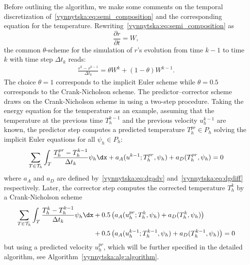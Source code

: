 Before outlining the algorithm, we make some comments on the temporal
discretization of~\eqref{vynnytska:eq:semi_composition} and the
corresponding equation for the
temperature. Rewriting~\eqref{vynnytska:eq:semi_composition} as
\begin{equation}
  \frac{\partial r}{\partial t} = W,
\end{equation}
the common $\theta$-scheme for the simulation of $r$'s evolution from
time $k-1$ to time $k$ with time step $\Delta t_k$ reads:
\begin{align}
  \label{vynnytska:eq:thetascheme}
  \frac{r^k - r^{k-1}}{\Delta t_k} = \theta W^k + (1 - \theta) W^{k-1}.
\end{align}
The choice $\theta = 1$ corresponds to the implicit Euler scheme while
$\theta = 0.5$ corresponds to the Crank-Nicholson scheme. The
predictor--corrector scheme draws on the Crank-Nicholson scheme in
using a two-step procedure. Taking the energy equation for the
temperature as an example, assuming that the temperature at the
previous time $T_h^{k-1}$ and the previous velocity $u_h^{k-1}$ are
known, the predictor step computes a predicted temperature $T_h^{pr}
\in P_h$ solving the implicit Euler equations for all $\psi_h \in
P_h$:
\begin{equation}
  \label{vynnytska:eq:predictor}
  \sum_{T \in \mathcal{T}_h}
  \int_T \frac{T_h^{pr} - T_h^{k-1}}{\Delta t_k} \psi_h \dx
  + a_{A} (u^{k-1}; T_h^{pr}, \psi_h) + a_D (T_h^{pr}, \psi_h) = 0
\end{equation}
where $a_A$ and $a_D$ are defined by~\eqref{vynnytska:eq:dgadv}
and~\eqref{vynnytska:eq:dgdiff} respectively. Later, the corrector
step computes the corrected temperature $T_h^k$ by a Crank-Nicholson
scheme
\begin{equation}
  \label{vynnytska:eq:corrector}
  \begin{split}
    \sum_{T \in \mathcal{T}_h}
    \int_T \frac{T_h^k - T_h^{k-1}}{\Delta t_k} \psi_h \dx
    &+ 0.5 \left( a_{A} (u_h^{pr}; T_h^{k}, \psi_h)
    + a_D (T_h^{k}, \psi_h) \right) \\
    &+ 0.5 \left( a_{A} (u_h^{k-1}; T_h^{k-1}, \psi_h)
    + a_D (T_h^{k-1}, \psi_h) \right) = 0
  \end{split}
\end{equation}
but using a predicted velocity $u_h^{pr}$, which will be further
specified in the detailed algorithm, see
Algorithm~\ref{vynnytska:alg:algorithm}.
